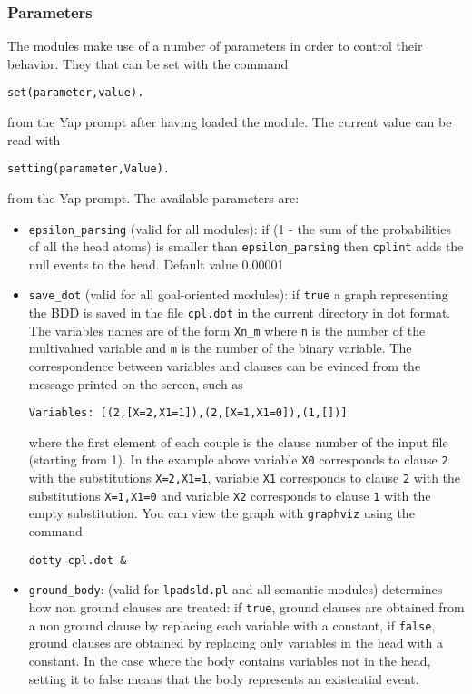 \documentclass[a4paper,10pt]{article}
\newcommand{\href}[2]{\Link[#1]{}{} #2 \EndLink}
\begin{document}
\subsubsection{Parameters}
The modules make use of a number of parameters in order to control their behavior. They that can be set with the command
\begin{verbatim}
set(parameter,value).
\end{verbatim}
from the Yap prompt after having loaded the module.
The current value can be read with
\begin{verbatim}
setting(parameter,Value).
\end{verbatim}
from the Yap prompt.
The available parameters are:
\begin{itemize}
\item 
	 \verb|epsilon_parsing| (valid for all modules): if (1 - the sum of the probabilities of all the head atoms) is smaller than 
    \verb|epsilon_parsing|
		then \texttt{cplint} adds the null events to the head. Default value 0.00001
\item 	\verb|save_dot| (valid for all goal-oriented modules): if \texttt{true} a graph representing the BDD is saved in the file \texttt{cpl.dot} in the current directory in dot format.
		The variables names are of the form \verb|Xn_m| where \texttt{n} is the number of the multivalued
		variable and \texttt{m} is the number of the binary variable. The correspondence between variables and 
		clauses can be evinced from the message printed on the screen, such as 
\begin{verbatim}
Variables: [(2,[X=2,X1=1]),(2,[X=1,X1=0]),(1,[])]
\end{verbatim}
		where the first element of each couple is the clause number of the input file (starting from 1).
		In the example above variable \texttt{X0} corresponds to clause \texttt{2} with the substitutions \texttt{X=2,X1=1},
		variable \texttt{X1} corresponds to clause \texttt{2} with the substitutions \texttt{X=1,X1=0} and
		variable \texttt{X2} corresponds to clause \texttt{1} with the empty substitution.
		You can view the graph with  \href{http://www.graphviz.org}{\texttt{graphviz}} using the
		command
\begin{verbatim}
dotty cpl.dot &
\end{verbatim}
\item \verb|ground_body|: (valid for \texttt{lpadsld.pl} and all semantic modules) determines how non ground clauses are treated: if \texttt{true}, ground clauses are obtained from a non ground clause by replacing each variable with a constant, if \texttt{false}, ground clauses are obtained by replacing only variables in the head with a constant. In the case where the body contains variables not in the head, setting it to false means that the body represents an existential event.

\end{itemize}
\end{document}
